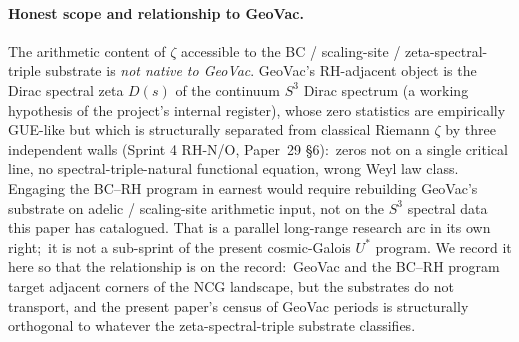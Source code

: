 \documentclass[11pt,a4paper]{article}
\theoremstyle{plain}
\theoremstyle{definition}
\newcommand{\sthree}{S^{3}}
\begin{document}
\paragraph{Honest scope and relationship to GeoVac.}
The arithmetic content of $\zeta$ accessible to the BC / scaling-site
/ zeta-spectral-triple substrate is \emph{not native to GeoVac}.
GeoVac's RH-adjacent object is the Dirac spectral zeta $D(s)$ of the
continuum $\sthree$ Dirac spectrum (a working hypothesis of the project's
internal register), whose zero
statistics are empirically GUE-like but which is structurally
separated from classical Riemann $\zeta$ by three independent walls
(Sprint 4 RH-N/O, Paper~29 \S 6):\ zeros not on a single critical
line, no spectral-triple-natural functional equation, wrong Weyl law
class.  Engaging the BC--RH program in earnest would require
rebuilding GeoVac's substrate on adelic / scaling-site arithmetic
input, not on the $\sthree$ spectral data this paper has
catalogued.  That is a parallel long-range research arc in its own
right;\ it is not a sub-sprint of the present cosmic-Galois $U^*$
program.  We record it here so that the relationship is on the
record:\ GeoVac and the BC--RH program target adjacent corners of
the NCG landscape, but the substrates do not transport, and the
present paper's census of GeoVac periods is structurally
orthogonal to whatever the zeta-spectral-triple substrate classifies.
\end{document}
